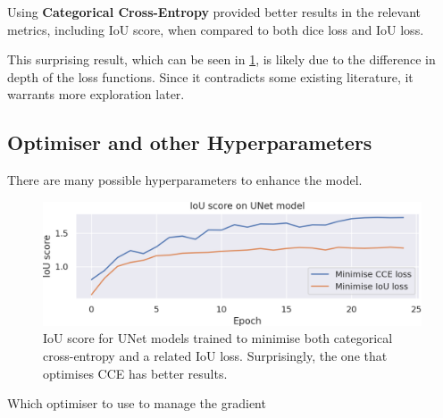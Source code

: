 Using \textbf{Categorical Cross-Entropy} provided better results in the relevant metrics, including IoU score, when compared to both dice loss and IoU loss.

This surprising result, which can be seen in \cref{iou_vs_cce}, is likely due to the difference in depth of the loss functions.
Since it contradicts some existing literature\cite{dice_loss}, it warrants more exploration later.


\subsection{Optimiser and other Hyperparameters}

There are many possible hyperparameters to enhance the model.


\begin{figure}
	\centering
	\includegraphics[width=\textwidth]{cce_vs_iou_loss.png}
	\caption{IoU score for UNet models trained to minimise both categorical cross-entropy and a related IoU loss. Surprisingly, the one that optimises CCE has better results.}
	\label{iou_vs_cce}
\end{figure}

\begin{description}[style=nextline]
	\item[Loss Function]
	\item[Optimiser]
		Which optimiser to use to manage the gradient 
\end{description}

